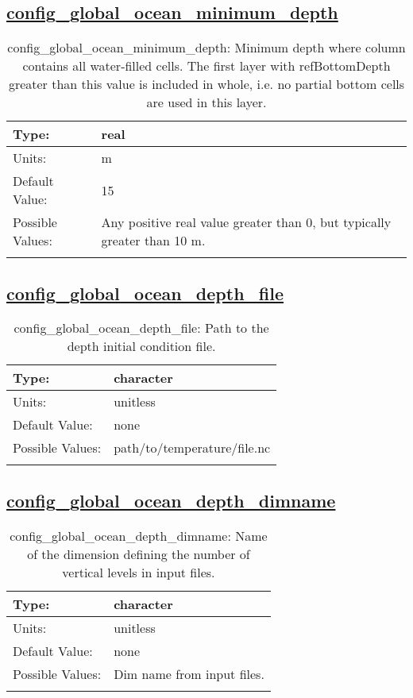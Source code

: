\subsection[config\_global\_ocean\_minimum\_depth]{\hyperref[sec:nm_tab_global_ocean]{config\_global\_ocean\_minimum\_depth}}
\label{subsec:nm_sec_config_global_ocean_minimum_depth}
\begin{center}
\begin{longtable}{| p{2.0in} || p{4.0in} |}
    \hline
    Type: & real \\
    \hline
    Units: & \si{m} \\
    \hline
    Default Value: & 15 \\
    \hline
    Possible Values: & Any positive real value greater than 0, but typically greater than 10 m. \\
    \hline
    \caption{config\_global\_ocean\_minimum\_depth: Minimum depth where column contains all water-filled cells.  The first layer with refBottomDepth greater than this value is included in whole, i.e. no partial bottom cells are used in this layer.}
\end{longtable}
\end{center}
\subsection[config\_global\_ocean\_depth\_file]{\hyperref[sec:nm_tab_global_ocean]{config\_global\_ocean\_depth\_file}}
\label{subsec:nm_sec_config_global_ocean_depth_file}
\begin{center}
\begin{longtable}{| p{2.0in} || p{4.0in} |}
    \hline
    Type: & character \\
    \hline
    Units: & \si{unitless} \\
    \hline
    Default Value: & none \\
    \hline
    Possible Values: & path/to/temperature/file.nc \\
    \hline
    \caption{config\_global\_ocean\_depth\_file: Path to the depth initial condition file.}
\end{longtable}
\end{center}
\subsection[config\_global\_ocean\_depth\_dimname]{\hyperref[sec:nm_tab_global_ocean]{config\_global\_ocean\_depth\_dimname}}
\label{subsec:nm_sec_config_global_ocean_depth_dimname}
\begin{center}
\begin{longtable}{| p{2.0in} || p{4.0in} |}
    \hline
    Type: & character \\
    \hline
    Units: & \si{unitless} \\
    \hline
    Default Value: & none \\
    \hline
    Possible Values: & Dim name from input files. \\
    \hline
    \caption{config\_global\_ocean\_depth\_dimname: Name of the dimension defining the number of vertical levels in input files.}
\end{longtable}
\end{center}
